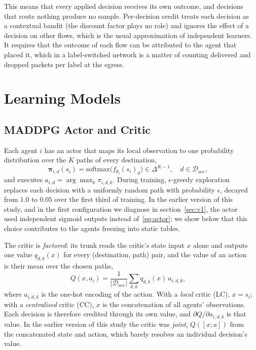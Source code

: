 \documentclass[10pt,journal,comsoc]{IEEEtran}
\begin{document}
This means that every applied decision receives its own outcome, and decisions that route nothing produce no sample. Per-decision credit treats each decision as a contextual bandit (the discount factor plays no role) and ignores the effect of a decision on other flows, which is the usual approximation of independent learners. It requires that the outcome of each flow can be attributed to the agent that placed it, which in a label-switched network is a matter of counting delivered and dropped packets per label at the egress.

\section{Learning Models}
\label{sec:maddpg}

\subsection{MADDPG Actor and Critic}
Each agent $i$ has an actor that maps its local observation to one probability distribution over the $K$ paths of every destination,
\begin{equation}
  \boldsymbol{\pi}_{i,d}(s_i) = \mathrm{softmax}\big(f_{\theta_i}(s_i)_d\big) \in \Delta^{K-1}, \quad d \in \mathcal{D}_{\text{acc}},
  \label{eq:actor}
\end{equation}
and executes $a_{i,d} = \arg\max_k \pi_{i,d,k}$. During training, $\epsilon$-greedy exploration replaces each decision with a uniformly random path with probability $\epsilon$, decayed from $1.0$ to $0.05$ over the first third of training. In the earlier version of this study, and in the first configuration we diagnose in section~\ref{sec:v1}, the actor used independent sigmoid outputs instead of~\eqref{eq:actor}; we show below that this choice contributes to the agents freezing into static tables.

The critic is \emph{factored}: its trunk reads the critic's state input $x$ alone and outputs one value $q_{d,k}(x)$ for every (destination, path) pair, and the value of an action is their mean over the chosen paths,
\begin{equation}
  Q(x, a_i) = \frac{1}{|\mathcal{D}_{\text{acc}}|} \sum_{d,k} q_{d,k}(x)\, a_{i,d,k},
  \label{eq:factored_critic}
\end{equation}
where $a_{i,d,k}$ is the one-hot encoding of the action. With a \emph{local} critic (LC), $x = s_i$; with a \emph{centralised} critic (CC), $x$ is the concatenation of all agents' observations. Each decision is therefore credited through its own value, and $\partial Q/\partial a_{i,d,k}$ is that value. In the earlier version of this study the critic was \emph{joint}, $Q([x; a])$ from the concatenated state and action, which barely resolves an individual decision's value.
\end{document}
